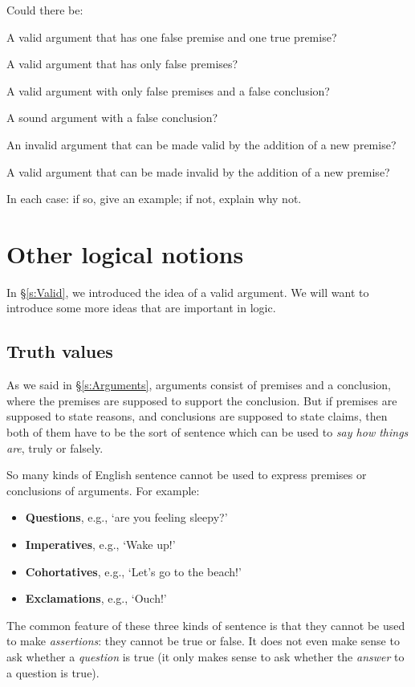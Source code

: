 \problempart
\label{pr.EnglishCombinations}
Could there be:
	\begin{earg}
		\item A valid argument that has one false premise and one true premise?
		\item A valid argument that has only false premises?
		\item A valid argument with only false premises and a false conclusion?
		\item A sound argument with a false conclusion?
		\item An invalid argument that can be made valid by the addition of a new premise?
		\item A valid argument that can be made invalid by the addition of a new premise?
	\end{earg}
In each case: if so, give an example; if not, explain why not.


\chapter{Other logical notions}\label{s:BasicNotions}

In §\ref{s:Valid}, we introduced the idea of a valid argument. We will want to introduce some more ideas that are important in logic.

\section{Truth values}
As we said in §\ref{s:Arguments}, arguments consist of premises and a conclusion, where the premises are supposed to support the conclusion. But if premises are supposed to state reasons, and conclusions are supposed to state claims, then both of them have to be the sort of sentence which can be used to \emph{say how things are}, truly or falsely. 

So many kinds of English sentence cannot be used to express premises or conclusions of arguments. For example:
	\begin{itemize}
		\item \textbf{Questions}, e.g., `are you feeling sleepy?'
		\item \textbf{Imperatives}, e.g., `Wake up!'
		\item \textbf{Cohortatives}, e.g., `Let's go to the beach!'
		\item \textbf{Exclamations}, e.g., `Ouch!'
	\end{itemize}
The common feature of these three kinds of sentence is that they cannot be used to make \emph{assertions}: they cannot be true or false. It does not even make sense to ask whether a \emph{question} is true (it only makes sense to ask whether the \emph{answer} to a question is true).

